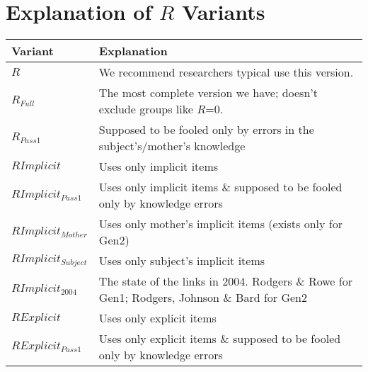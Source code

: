 \documentclass{article}\usepackage[]{graphicx}\usepackage[]{color}
\begin{document}
\section{Explanation of $R$ Variants}
\begin{tabular}{l l}
\textbf{Variant} & \textbf{Explanation} \\
\hline
$R$ & We recommend researchers typical use this version. \\
$R_{Full}$ & The most complete version we have; doesn't exclude groups like $R$=0. \\
$R_{Pass1}$ & Supposed to be fooled only by errors in the subject's/mother's knowledge \\
\hline
$RImplicit$ & Uses only implicit items \\
$RImplicit_{Pass1}$ & Uses only implicit items \& supposed to be fooled only by knowledge errors \\
$RImplicit_{Mother}$ & Uses only mother's implicit items (exists only for Gen2)\\
$RImplicit_{Subject}$ & Uses only subject's implicit items\\
$RImplicit_{2004}$ & The state of the links in 2004.  Rodgers \& Rowe for Gen1; Rodgers, Johnson \& Bard for Gen2 \\
\hline
$RExplicit$ & Uses only explicit items \\
$RExplicit_{Pass1}$ & Uses only explicit items \& supposed to be fooled only by knowledge errors \\

\hline
\end{tabular}
\end{document}
